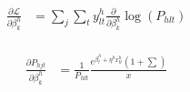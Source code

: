 \documentclass[12pt]{article}
\theoremstyle{plain}
\begin{document}
\begin{align*}
  \frac{\partial \mathcal{L}}{\partial \beta_k^h} &= \sum_j \sum_t y_{lt}^h \frac{\partial}{\partial \beta_k^h} \log(P_{hlt}) \\
\end{align*}


\begin{align*}
  \frac{\partial P_{hjt}}{\partial \beta_k^h} &= \frac{1}{P_{hlt}} \frac{e^{\beta_l^h + \eta^h x_{lt}^h} (1+\sum_{})}{x}
\end{align*}
\end{document}
